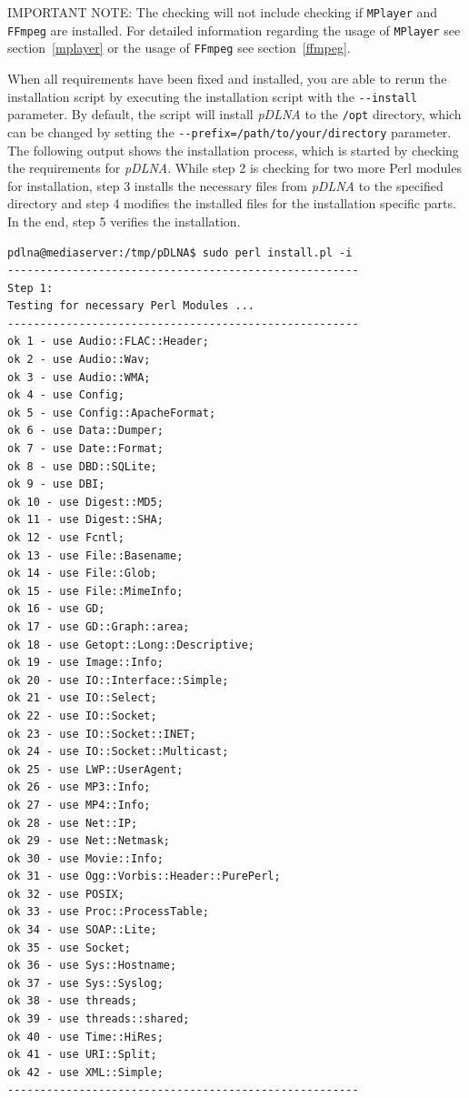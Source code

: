 \documentclass[a4paper,oneside,10pt]{report}
\newenvironment{colframecmd}{%
  \begin{Sbox}
    \begin{minipage}{.99\columnwidth}
}{%
  \end{minipage}
  \end{Sbox}
  \begin{center}
    \fcolorbox{black}{LightSteelBlue}{\TheSbox}
  \end{center}
}
\newenvironment{colframeimportantnote}{%
  \begin{Sbox}
    \begin{minipage}{.99\columnwidth}
}{%
  \end{minipage}
  \end{Sbox}
  \begin{center}
    \fcolorbox{black}{Orange}{\TheSbox}
  \end{center}
}
\begin{document}
\begin{colframeimportantnote}
\textsc{IMPORTANT NOTE:} The checking will not include checking if \verb|MPlayer| and \verb|FFmpeg| are installed. For detailed information regarding the usage of \verb|MPlayer| see section~\ref{mplayer} or the usage of \verb|FFmpeg| see section~\ref{ffmpeg}.
\end{colframeimportantnote}

When all requirements have been fixed and installed, you are able to rerun the installation script by executing the installation script with the \verb|--install| parameter. By default, the script will install {\em pDLNA} to the \verb|/opt| directory, which can be changed by setting the \verb|--prefix=/path/to/your/directory| parameter. The following output shows the installation process, which is started by checking the requirements for {\em pDLNA}. While step 2 is checking for two more Perl modules for installation, step 3 installs the necessary files from {\em pDLNA} to the specified directory and step 4 modifies the installed files for the installation specific parts. In the end, step 5 verifies the installation.
\begin{colframecmd}
\begin{verbatim}
pdlna@mediaserver:/tmp/pDLNA$ sudo perl install.pl -i
------------------------------------------------------
Step 1:
Testing for necessary Perl Modules ...
------------------------------------------------------
ok 1 - use Audio::FLAC::Header;
ok 2 - use Audio::Wav;
ok 3 - use Audio::WMA;
ok 4 - use Config;
ok 5 - use Config::ApacheFormat;
ok 6 - use Data::Dumper;
ok 7 - use Date::Format;
ok 8 - use DBD::SQLite;
ok 9 - use DBI;
ok 10 - use Digest::MD5;
ok 11 - use Digest::SHA;
ok 12 - use Fcntl;
ok 13 - use File::Basename;
ok 14 - use File::Glob;
ok 15 - use File::MimeInfo;
ok 16 - use GD;
ok 17 - use GD::Graph::area;
ok 18 - use Getopt::Long::Descriptive;
ok 19 - use Image::Info;
ok 20 - use IO::Interface::Simple;
ok 21 - use IO::Select;
ok 22 - use IO::Socket;
ok 23 - use IO::Socket::INET;
ok 24 - use IO::Socket::Multicast;
ok 25 - use LWP::UserAgent;
ok 26 - use MP3::Info;
ok 27 - use MP4::Info;
ok 28 - use Net::IP;
ok 29 - use Net::Netmask;
ok 30 - use Movie::Info;
ok 31 - use Ogg::Vorbis::Header::PurePerl;
ok 32 - use POSIX;
ok 33 - use Proc::ProcessTable;
ok 34 - use SOAP::Lite;
ok 35 - use Socket;
ok 36 - use Sys::Hostname;
ok 37 - use Sys::Syslog;
ok 38 - use threads;
ok 39 - use threads::shared;
ok 40 - use Time::HiRes;
ok 41 - use URI::Split;
ok 42 - use XML::Simple;
------------------------------------------------------
\end{verbatim}
\end{colframecmd}
\end{document}

